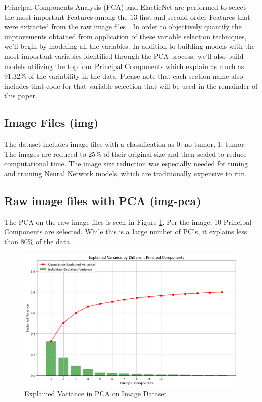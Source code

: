 \documentclass{article}
\begin{document}
Principal Components Analysis (PCA) and ElacticNet are performed to select the most important Features among the 13 first and second order Features that were extracted from the raw image files \cite{accurate-detection}. In order to objectively quantify the improvements obtained from application of these variable selection techniques, we'll begin by modeling all the variables. In addition to building models with the most important variables identified through the PCA process, we'll also build models utilizing the top four Principal Components which explain as much as 91.32\% of the variability in the data. Please note that each section name also includes that code for that variable selection that will be used in the remainder of this paper.

\subsection{Image Files (img)}
The dataset includes image files with a classification as 0: no tumor, 1: tumor. The images are reduced to 25\% of their original size and then scaled to reduce computational time. The image size reduction was especially needed for tuning and training Neural Network models, which are traditionally expensive to run.

\subsection{Raw image files with PCA (img-pca)}
The PCA on the raw image files is seen in Figure \ref{pca-image-explained}. Per the image, 10 Principal Components are selected. While this is a large number of PC's, it explains less than 80\% of the data.

\begin{figure}[H]
    \centering
    \includegraphics[width = .8\textwidth]{images/pca-images.png}
    \caption{Explained Variance in PCA on Image Dataset}
    \label{pca-image-explained}
\end{figure}
\end{document}
